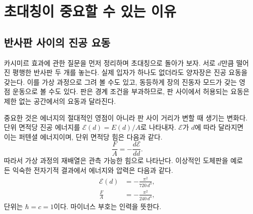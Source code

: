 \chapter{초대칭이 중요할 수 있는 이유}


\section{반사판 사이의 진공 요동}

카시미르 효과에 관한 질문을 먼저 정리하며 초대칭으로 돌아가 보자. 서로 \(d\)만큼 떨어진 평행한 반사판 두 개를 놓는다. 실제 입자가 하나도 없더라도 양자장은 진공 요동을 갖는다. 이를 가상 과정으로 그려 볼 수도 있고, 동등하게 장의 진동자 모드가 갖는 영점 운동으로 볼 수도 있다. 판은 경계 조건을 부과하므로, 판 사이에서 허용되는 요동은 제한 없는 공간에서의 요동과 달라진다.

중요한 것은 에너지의 절대적인 영점이 아니라 판 사이 거리가 변할 때 생기는 변화다. 단위 면적당 진공 에너지를 \(\mathcal E(d)=E(d)/A\)로 나타내자. \(\mathcal E\)가 \(d\)에 따라 달라지면 이는 퍼텐셜 에너지이며, 단위 면적당 힘은 다음과 같다.
\begin{equation}
\frac{F}{A}=-\frac{d\mathcal E}{dd}.
\end{equation}
따라서 가상 과정의 재배열은 관측 가능한 힘으로 나타난다. 이상적인 도체판을 예로 든 익숙한 전자기적 결과에서 에너지와 압력은 다음과 같다.
\begin{align}
\mathcal E(d)&=-\frac{\pi^2}{720\,d^3},\\
\frac{F}{A}&=-\frac{\pi^2}{240\,d^4},
\end{align}
단위는 \(\hbar=c=1\)이다. 마이너스 부호는 인력을 뜻한다.

\begin{classroomqa}
\end{classroomqa}


